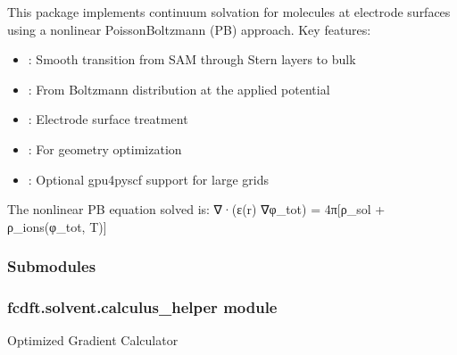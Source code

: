 \documentclass[letterpaper,10pt,english]{sphinxmanual}
\begin{document}
\sphinxAtStartPar
This package implements continuum solvation for molecules at electrode surfaces using
a non\sphinxhyphen{}linear Poisson\sphinxhyphen{}Boltzmann (PB) approach. Key features:
\begin{itemize}
\item {} 
\sphinxAtStartPar
{}: Smooth transition from SAM through Stern layers to bulk

\item {} 
\sphinxAtStartPar
{}: From Boltzmann distribution at the applied potential

\item {} 
\sphinxAtStartPar
{}: Electrode surface treatment

\item {} 
\sphinxAtStartPar
{}: For geometry optimization

\item {} 
\sphinxAtStartPar
{}: Optional gpu4pyscf support for large grids

\end{itemize}

\sphinxAtStartPar
The non\sphinxhyphen{}linear PB equation solved is: ∇·(ε(r) ∇φ\_tot) = \sphinxhyphen{}4π{[}ρ\_sol + ρ\_ions(φ\_tot, T){]}


\subsubsection{Submodules}
\label{\detokenize{fcdft.solvent:submodules}}

\subsubsection{fcdft.solvent.calculus\_helper module}
\label{\detokenize{fcdft.solvent:module-fcdft.solvent.calculus_helper}}\label{\detokenize{fcdft.solvent:fcdft-solvent-calculus-helper-module}}

\begin{fulllineitems}
\label{\detokenize{fcdft.solvent:fcdft.solvent.calculus_helper.dirichlet_gradient}}
\pysigstartsignatures
\pysiglinewithargsret
{}
{\sphinxparamcomma {}}
{}
\pysigstopsignatures
\sphinxAtStartPar
Optimized Gradient Calculator

\end{fulllineitems}
\end{document}
